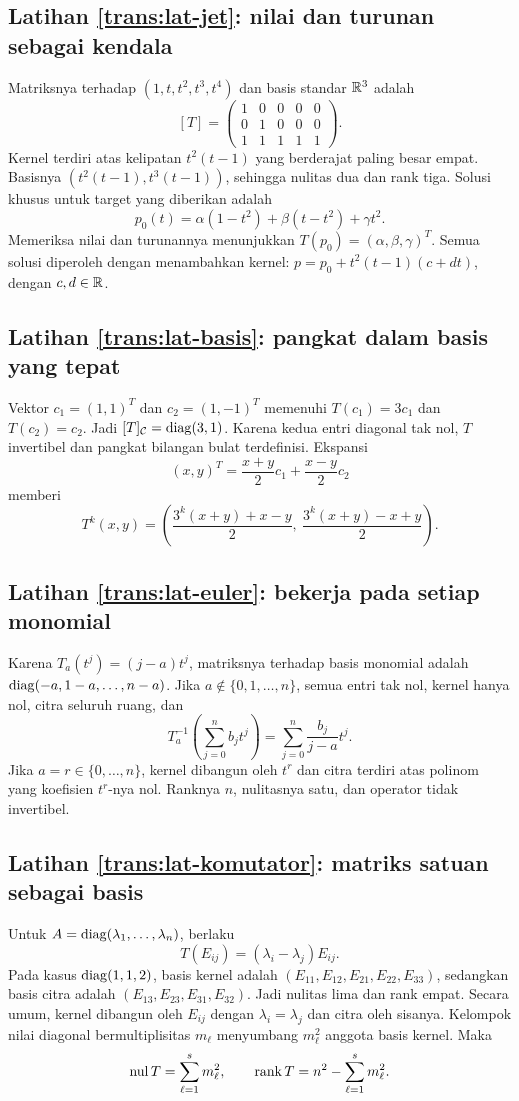 \subsection*{Latihan \ref{trans:lat-jet}: nilai dan turunan sebagai kendala}
Matriksnya terhadap $(1,t,t^2,t^3,t^4)$ dan basis standar $\mathbb{R}^3$ adalah
\[
    [T]=\begin{pmatrix}1&0&0&0&0\\0&1&0&0&0\\1&1&1&1&1\end{pmatrix}.
\]
Kernel terdiri atas kelipatan $t^2(t-1)$ yang berderajat paling
besar empat. Basisnya $(t^2(t-1),t^3(t-1))$, sehingga nulitas
dua dan rank tiga. Solusi khusus untuk target yang diberikan adalah
\[
    p_0(t)=\alpha(1-t^2)+\beta(t-t^2)+\gamma t^2.
\]
Memeriksa nilai dan turunannya menunjukkan $T(p_0)=(\alpha,\beta,\gamma)^T$.
Semua solusi diperoleh dengan menambahkan kernel:
$p=p_0+t^2(t-1)(c+dt)$, dengan $c,d\in\mathbb{R}$.

\subsection*{Latihan \ref{trans:lat-basis}: pangkat dalam basis yang tepat}
Vektor $c_1=(1,1)^T$ dan $c_2=(1,-1)^T$ memenuhi
$T(c_1)=3c_1$ dan $T(c_2)=c_2$. Jadi $[T]_{\mathcal C}=\operatorname{diag}(3,1)$.
Karena kedua entri diagonal tak nol, $T$ invertibel dan
pangkat bilangan bulat terdefinisi. Ekspansi
\[
    (x,y)^T=\frac{x+y}{2}c_1+\frac{x-y}{2}c_2
\]
memberi
\[
    T^k(x,y)=\left(
      \frac{3^k(x+y)+x-y}{2},\
      \frac{3^k(x+y)-x+y}{2}\right).
\]

\subsection*{Latihan \ref{trans:lat-euler}: bekerja pada setiap monomial}
Karena $T_a(t^j)=(j-a)t^j$, matriksnya terhadap basis monomial
adalah $\operatorname{diag}(-a,1-a,\ldots,n-a)$.
Jika $a\notin\{0,1,\ldots,n\}$, semua entri tak nol,
kernel hanya nol, citra seluruh ruang, dan
\[
    T_a^{-1}\left(\sum_{j=0}^n b_jt^j\right)
      =\sum_{j=0}^n\frac{b_j}{j-a}t^j.
\]
Jika $a=r\in\{0,\ldots,n\}$, kernel dibangun oleh $t^r$ dan
citra terdiri atas polinom yang koefisien $t^r$-nya nol.
Ranknya $n$, nulitasnya satu, dan operator tidak invertibel.

\subsection*{Latihan \ref{trans:lat-komutator}: matriks satuan sebagai basis}
Untuk $A=\operatorname{diag}(\lambda_1,\ldots,\lambda_n)$, berlaku
\[
    T(E_{ij})=(\lambda_i-\lambda_j)E_{ij}.
\]
Pada kasus $\operatorname{diag}(1,1,2)$, basis kernel adalah
$(E_{11},E_{12},E_{21},E_{22},E_{33})$, sedangkan basis citra
adalah $(E_{13},E_{23},E_{31},E_{32})$.
Jadi nulitas lima dan rank empat.
Secara umum, kernel dibangun oleh $E_{ij}$ dengan
$\lambda_i=\lambda_j$ dan citra oleh sisanya. Kelompok nilai
diagonal bermultiplisitas $m_\ell$ menyumbang $m_\ell^2$ anggota
basis kernel. Maka
\[
    \operatorname{nul} T=\sum_{\ell=1}^s m_\ell^2,\qquad
    \operatorname{rank} T=n^2-\sum_{\ell=1}^s m_\ell^2.
\]

